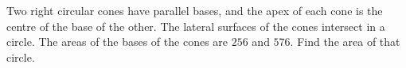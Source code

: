 Two right circular cones have parallel bases, and the apex of each cone is the centre of the base of the other. The lateral surfaces of the cones intersect in a circle. The areas of the bases of the cones are $256$ and $576$. Find the area of that circle.
